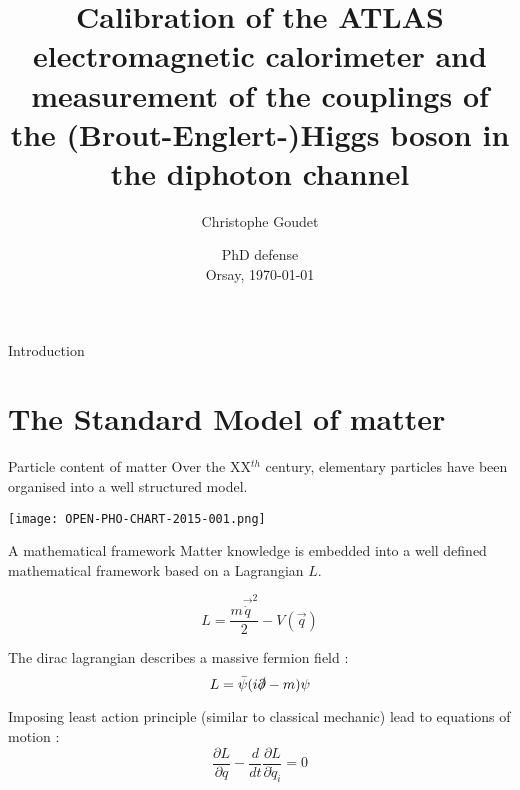 \documentclass[a4paper]{beamer}
\title[Energy calibration \& Higgs couplings]{Calibration of the ATLAS electromagnetic calorimeter and measurement of the couplings of the (Brout-Englert-)Higgs boson in the diphoton channel}
\author[Goudet]{Christophe Goudet}
\institute[LAL]{\texttt{[image: LAL.jpg]} }
\date[Orsay, \today]{PhD defense \\ Orsay, \today}
\begin{document}
\transboxin
\begin{frame}
\maketitle
\end{frame}

\begin{frame}{Introduction}
\tableofcontents
\end{frame}

\section{The Standard Model of matter}
\begin{frame}{Particle content of matter}
    Over the XX$^{th}$ century, elementary particles have been organised into a well structured model.

  \begin{center} \texttt{[image: OPEN-PHO-CHART-2015-001.png]} \end{center}
\end{frame}
\begin{frame}{A mathematical framework}
  Matter knowledge is embedded into a well defined mathematical framework based on a Lagrangian $L$.

  \begin{equation}
    L = \frac{m \vec{\dot{q}}^2}{2} - V(\vec{q})
  \end{equation}

  The dirac lagrangian describes a massive fermion field :
  \begin{equation}
    L = \bar{\psi} ( i\slashed{\partial} - m ) \psi
  \end{equation}
  
  Imposing least action principle (similar to classical mechanic) lead to equations of motion :
  \begin{equation}
    \frac{\partial L}{\partial q} - \frac{d}{dt}\frac{\partial L}{\partial \dot{q}_i} = 0
  \end{equation}
  
\end{frame}
\end{document}
